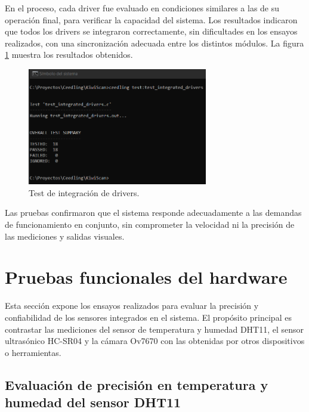 En el proceso, cada driver fue evaluado en condiciones similares a las de su operación final, para verificar la capacidad del sistema. Los resultados indicaron que todos los drivers se integraron correctamente, sin dificultades en los ensayos realizados, con una sincronización adecuada entre los distintos módulos. La figura \ref{fig:test_integrated_drivers} muestra los resultados obtenidos.

\vspace{1cm}

\begin{figure}[htbp]
	\centering
	\includegraphics[width=0.7\textwidth, height=0.3\textheight]{./Figures/test_integrated_drivers.png}
	\caption{Test de integración de drivers.}
	\label{fig:test_integrated_drivers}
\end{figure}

\vspace{1cm}

Las pruebas confirmaron que el sistema responde adecuadamente a las demandas de funcionamiento en conjunto, sin comprometer la velocidad ni la precisión de las mediciones y salidas visuales.

\section{Pruebas funcionales del hardware}
\label{pruebas_funcionales_hardware}

Esta sección expone los ensayos realizados para evaluar la precisión y confiabilidad de los sensores integrados en el sistema. El propósito principal es contrastar las mediciones del sensor de temperatura y humedad DHT11, el sensor ultrasónico HC-SR04 y la cámara Ov7670 con las obtenidas por otros dispositivos o herramientas.

\subsection{Evaluación de precisión en temperatura y humedad del sensor DHT11}

